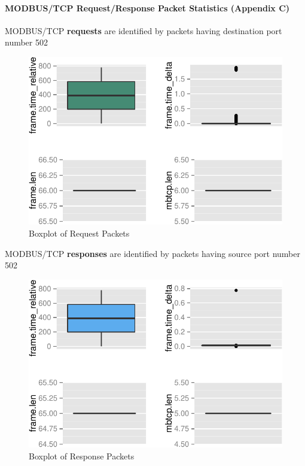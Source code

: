 \documentclass[12pt,]{article}
\begin{document}
\newpage

\paragraph{MODBUS/TCP Request/Response Packet Statistics (Appendix
C)}\label{modbustcp-requestresponse-packet-statistics-appendix-c}

\medskip

MODBUS/TCP \textbf{requests} are identified by packets having
destination port number 502

\nopagebreak

\begin{figure}

{\centering \includegraphics{thesis_files/figure-latex/unnamed-chunk-25-1} 

}

\caption{Boxplot of Request Packets}\label{fig:unnamed-chunk-25}
\end{figure}

\nopagebreak

MODBUS/TCP \textbf{responses} are identified by packets having source
port number 502

\nopagebreak

\begin{figure}

{\centering \includegraphics{thesis_files/figure-latex/unnamed-chunk-27-1} 

}

\caption{Boxplot of Response Packets}\label{fig:unnamed-chunk-27}
\end{figure}
\end{document}
